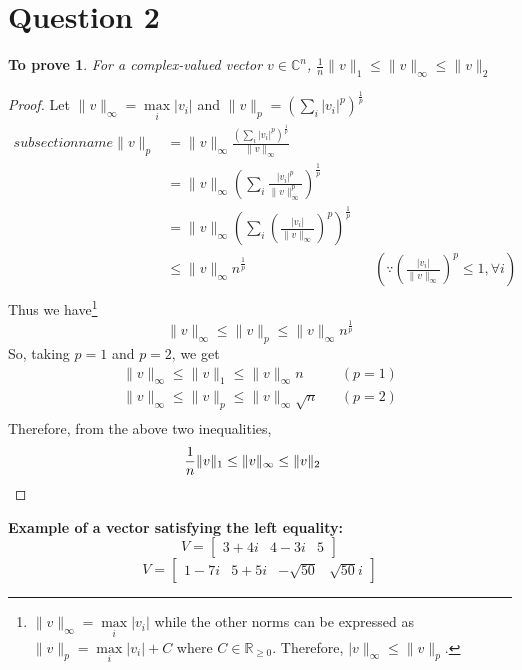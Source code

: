 \documentclass[11pt, oneside]{article}
\newtheorem*{remark}{To prove}
\begin{document}
\section*{Question 2}
  \begin{remark}
    For a complex-valued vector $v \in \mathbb{C}^n$, $\frac{1}{n}\|v\|_1 \leq \|v\|_{\infty} \leq \|v\|_2$
  \end{remark}
  \begin{proof}
    Let $\|v\|_{\infty} = \max\limits_i |v_i|$ and $\|v\|_p = \left(\sum\limits_i |v_i|^p \right)^{\frac{1}{p}}$
    \begin{align*}subsection name
      \|v\|_p &= \|v\|_{\infty} \frac{\left(\sum_i |v_i|^p\right)^{\frac{1}{p}}}{\|v\|_{\infty}} \\
              &= \|v\|_{\infty} \left(\sum_i\frac{|v_i|^p}{\|v\|_{\infty}^p}\right)^{\frac{1}{p}} \\
              &= \|v\|_{\infty} \left(\sum_i \left(\frac{|v_i|}{\|v\|_{\infty}}\right)^{p}\right)^{\frac{1}{p}} \\
              &\leq \|v\|_{\infty} n^{\frac{1}{p}} && \left(\because \left(\frac{|v_i|}{\|v\|_{\infty}}\right)^p \leq 1, \forall i\right) \\
    \end{align*}
    Thus we have\footnote{$\|v\|_{\infty} = \max\limits_i |v_i|$ while the other norms can be expressed as $\|v\|_{p} = \max\limits_i |v_i| + C$ where $C \in \mathbb{R}_{\ge 0}$. Therefore, $|v\|_{\infty} \leq \|v\|_{p}$.}
    \begin{equation*}
      \|v\|_{\infty} \leq \|v\|_{p} \leq \|v\|_{\infty} n^{\frac{1}{p}}
    \end{equation*}
    So, taking $p=1$ and $p=2$, we get
    \begin{align*}
      \|v\|_{\infty} \leq \|v\|_{1} \leq \|v\|_{\infty} n && (p=1)\\
      \|v\|_{\infty} \leq \|v\|_{p} \leq \|v\|_{\infty} \sqrt{n} && (p=2)\\
    \end{align*}
    Therefore, from the above two inequalities,
    \begin{align*}
      \frac{1}{n}\|v\|_1 \leq \|v\|_{\infty} \leq \|v\|_2 && \qedhere
    \end{align*}
  \end{proof}

  \noindent\textbf{Example of a vector satisfying the left equality:} \begin{equation*}
    V = \begin{bmatrix}
      3 + 4 i & 4 - 3 i & 5
  \end{bmatrix}
  \end{equation*}
  \begin{equation*}
    V = \begin{bmatrix}
      1 - 7 i & 5 + 5 i & -\sqrt{50} & \sqrt{50}i
  \end{bmatrix}
  \end{equation*}
\end{document}
